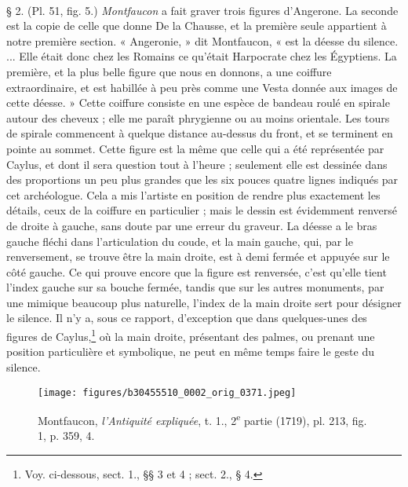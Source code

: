 \documentclass[a4paper, 11pt, oneside, polutonikogreek, french]{article}
\begin{document}
\paragraph{}
§ 2. (Pl. 51, fig. 5.) \emph{Montfaucon} a fait graver trois figures d'Angerone. La seconde est la copie de celle que donne De la Chausse, et la première seule appartient à notre première section. « Angeronie, » dit Montfaucon, « est la déesse du silence. ... Elle était donc chez les Romains ce qu'était Harpocrate chez les Égyptiens. La première, et la plus belle figure que nous en donnons, a une coiffure extraordinaire, et est habillée à peu près comme une Vesta donnée aux images de cette déesse. » Cette coiffure consiste en une espèce de bandeau roulé en spirale autour des cheveux ; elle me paraît phrygienne ou au moins orientale. Les tours de spirale commencent à quelque distance au-dessus du front, et se terminent en pointe au sommet. Cette figure est la même que celle qui a été représentée par Caylus, et dont il sera question tout à l'heure ; seulement elle est dessinée dans des proportions un peu plus grandes que les six pouces quatre lignes indiqués par cet archéologue. Cela a mis l'artiste en position de rendre plus exactement les détails, ceux de la coiffure en particulier ; mais le dessin est évidemment renversé de droite à gauche, sans doute par une erreur du graveur. La déesse a le bras gauche fléchi dans l'articulation du coude, et la main gauche, qui, par le renversement, se trouve être la main droite, est à demi fermée et appuyée sur le côté gauche. Ce qui prouve encore que la figure est renversée, c'est qu'elle tient l'index gauche sur sa bouche fermée, tandis que sur les autres monuments, par une mimique beaucoup plus naturelle, l'index de la main droite sert pour désigner le silence. Il n'y a, sous ce rapport, d'exception que dans quelques-unes des figures de Caylus,\footnote{Voy. ci-dessous, sect. 1., §§ 3 et 4 ; sect. 2., § 4.} où la main droite, présentant des palmes, ou prenant une position particulière et symbolique, ne peut en même temps faire le geste du silence.
\clearpage
\vspace*{\fill}
\begin{figure}[H]
\centering
\texttt{[image: figures/b30455510\_0002\_orig\_0371.jpeg]}
\caption{Montfaucon, \emph{l'Antiquité expliquée}, t. 1., 2\textsuperscript{e} partie (1719), pl. 213, fig. 1, p. 359, 4.}
\end{figure}
\vspace*{\fill}
\clearpage
\end{document}
